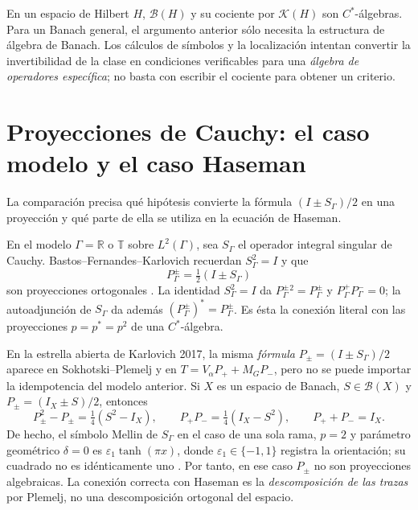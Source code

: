 En un espacio de Hilbert $H$, $\mathcal B(H)$ y su cociente por
$\mathcal K(H)$ son $C^*$-álgebras. Para un Banach general, el argumento
anterior sólo necesita la estructura de álgebra de Banach. Los cálculos de
símbolos y la localización intentan convertir la invertibilidad de la clase
en condiciones verificables para una \emph{álgebra de operadores específica};
no basta con escribir el cociente para obtener un criterio.

\section{Proyecciones de Cauchy: el caso modelo y el caso Haseman}

La comparación precisa qué hipótesis convierte la fórmula
$(I\pm S_\Gamma)/2$ en una proyección y qué parte de ella se utiliza en
la ecuación de Haseman.

En el modelo $\Gamma=\mathbb R$ o $\mathbb T$ sobre $L^2(\Gamma)$,
sea $S_\Gamma$ el operador integral singular de Cauchy.
Bastos--Fernandes--Karlovich recuerdan $S_\Gamma^2=I$ y que
\[
 P_\Gamma^\pm=\tfrac12(I\pm S_\Gamma)
\]
son proyecciones ortogonales \cite[§2, p.~22]{BFK2006}. La identidad
$S_\Gamma^2=I$ da $P_\Gamma^\pm{}^2=P_\Gamma^\pm$ y
$P_\Gamma^+P_\Gamma^-=0$; la autoadjunción de $S_\Gamma$ da además
$(P_\Gamma^\pm)^*=P_\Gamma^\pm$. Es ésta la conexión literal con las
proyecciones $p=p^*=p^2$ de una $C^*$-álgebra.

\begin{center}
\end{center}

En la estrella abierta de Karlovich 2017, la misma \emph{fórmula}
$P_\pm=(I\pm S_\Gamma)/2$ aparece en Sokhotski--Plemelj y en
$T=V_\alpha P_++M_GP_-$, pero no se puede importar la idempotencia del
modelo anterior. Si $X$ es un espacio de Banach, $S\in\mathcal B(X)$
y $P_\pm=(I_X\pm S)/2$, entonces
\[
 P_\pm^2-P_\pm=\tfrac14(S^2-I_X),\qquad
 P_+P_-=\tfrac14(I_X-S^2),\qquad P_++P_-=I_X.
\]
De hecho, el símbolo Mellin de $S_\Gamma$ en el caso de una sola rama,
$p=2$ y parámetro geométrico $\delta=0$ es
$\varepsilon_1\tanh(\pi x)$, donde $\varepsilon_1\in\{-1,1\}$
registra la orientación; su cuadrado
no es idénticamente uno \cite[teorema~5.3, p.~476]{Karlovich2017}.
Por tanto, en ese caso $P_\pm$ no son proyecciones algebraicas.
La conexión correcta con Haseman es la \emph{descomposición de las trazas}
por Plemelj, no una descomposición ortogonal del espacio.

